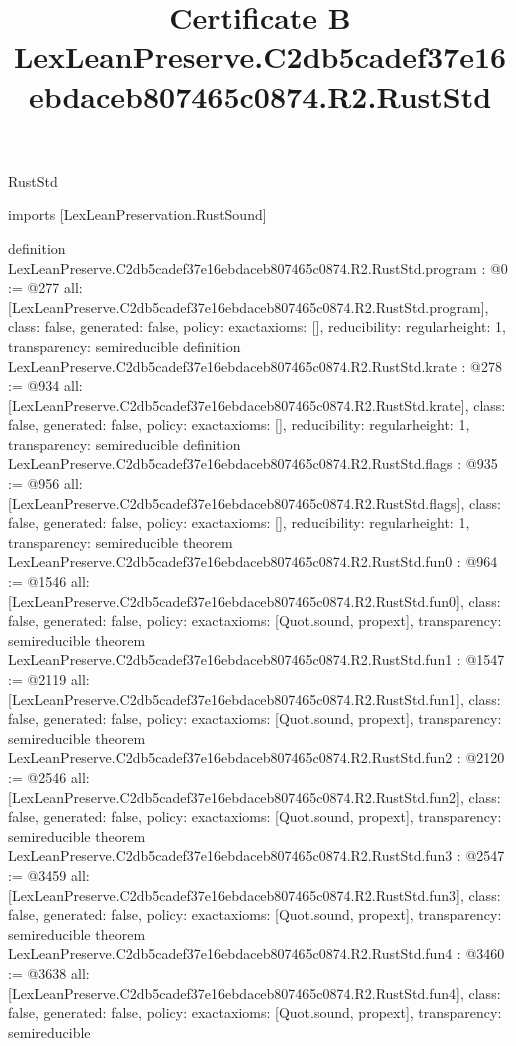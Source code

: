 \begin{lexlean}{RustStd}
\title{Certificate B LexLeanPreserve.C2db5cadef37e16ebdaceb807465c0874.R2.RustStd}
\begin{coremodule}
imports [LexLeanPreservation.RustSound]

definition LexLeanPreserve.C2db5cadef37e16ebdaceb807465c0874.R2.RustStd.program : @0 := @277 {
  all: [LexLeanPreserve.C2db5cadef37e16ebdaceb807465c0874.R2.RustStd.program],
  class: false,
  generated: false,
  policy: exact{axioms: []},
  reducibility: regular{height: 1},
  transparency: semireducible
}
definition LexLeanPreserve.C2db5cadef37e16ebdaceb807465c0874.R2.RustStd.krate : @278 := @934 {
  all: [LexLeanPreserve.C2db5cadef37e16ebdaceb807465c0874.R2.RustStd.krate],
  class: false,
  generated: false,
  policy: exact{axioms: []},
  reducibility: regular{height: 1},
  transparency: semireducible
}
definition LexLeanPreserve.C2db5cadef37e16ebdaceb807465c0874.R2.RustStd.flags : @935 := @956 {
  all: [LexLeanPreserve.C2db5cadef37e16ebdaceb807465c0874.R2.RustStd.flags],
  class: false,
  generated: false,
  policy: exact{axioms: []},
  reducibility: regular{height: 1},
  transparency: semireducible
}
theorem LexLeanPreserve.C2db5cadef37e16ebdaceb807465c0874.R2.RustStd.fun0 : @964 := @1546 {
  all: [LexLeanPreserve.C2db5cadef37e16ebdaceb807465c0874.R2.RustStd.fun0],
  class: false,
  generated: false,
  policy: exact{axioms: [Quot.sound, propext]},
  transparency: semireducible
}
theorem LexLeanPreserve.C2db5cadef37e16ebdaceb807465c0874.R2.RustStd.fun1 : @1547 := @2119 {
  all: [LexLeanPreserve.C2db5cadef37e16ebdaceb807465c0874.R2.RustStd.fun1],
  class: false,
  generated: false,
  policy: exact{axioms: [Quot.sound, propext]},
  transparency: semireducible
}
theorem LexLeanPreserve.C2db5cadef37e16ebdaceb807465c0874.R2.RustStd.fun2 : @2120 := @2546 {
  all: [LexLeanPreserve.C2db5cadef37e16ebdaceb807465c0874.R2.RustStd.fun2],
  class: false,
  generated: false,
  policy: exact{axioms: [Quot.sound, propext]},
  transparency: semireducible
}
theorem LexLeanPreserve.C2db5cadef37e16ebdaceb807465c0874.R2.RustStd.fun3 : @2547 := @3459 {
  all: [LexLeanPreserve.C2db5cadef37e16ebdaceb807465c0874.R2.RustStd.fun3],
  class: false,
  generated: false,
  policy: exact{axioms: [Quot.sound, propext]},
  transparency: semireducible
}
theorem LexLeanPreserve.C2db5cadef37e16ebdaceb807465c0874.R2.RustStd.fun4 : @3460 := @3638 {
  all: [LexLeanPreserve.C2db5cadef37e16ebdaceb807465c0874.R2.RustStd.fun4],
  class: false,
  generated: false,
  policy: exact{axioms: [Quot.sound, propext]},
  transparency: semireducible
}
\end{coremodule}
\end{lexlean}
